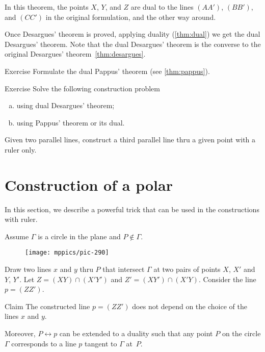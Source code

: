 In this theorem, the points $X$, $Y$, and $Z$ 
are dual to the lines $(AA')$, $(BB')$, and $(CC')$ in the original formulation, and the other way around.

Once Desargues' theorem is proved, applying duality (\ref{thm:dual})
we get the dual Desargues' theorem.
Note that the dual Desargues' theorem is the converse to the original Desargues' theorem~\ref{thm:desargues}.

\begin{thm}{Exercise}\label{ex:dual-pappus}
Formulate the dual Pappus' theorem (see \ref{thm:pappus}).
\end{thm}

\begin{thm}{Exercise}\label{ex:dual-desargues-construction} 
Solve the following construction problem
\begin{enumerate}[(a)]
\item\label{ex:dual-desargues-construction:desargues} using dual Desargues' theorem;
\item\label{ex:dual-desargues-construction:pappus} using Pappus' theorem or its dual.
\end{enumerate}
Given two parallel lines, construct a third parallel line thru a given point with a ruler only.
\end{thm}

\section{Construction of a polar}

In this section, we describe a powerful trick that can be used in the constructions with ruler.

Assume $\Gamma$ is a circle in the plane and $P\notin \Gamma$.
\begin{figure}[!ht]
\centering
\texttt{[image: mppics/pic-290]}
\end{figure}
Draw two lines $x$ and $y$ thru $P$ that intersect $\Gamma$ at two pairs of points $X$, $X'$ and $Y$, $Y'$.
Let $Z=(XY)\cap(X'Y')$ and $Z'=(XY')\cap(X'Y)$.
Consider the line $p=(ZZ')$.

\begin{thm}{Claim}\label{clm:polar}
The constructed line $p=(ZZ')$ does not depend on the choice of the lines $x$ and $y$.

Moreover, $P\leftrightarrow p$ can be extended to a duality such that any point $P$ on the circle $\Gamma$ corresponds to a line $p$ tangent to $\Gamma$ at~$P$. 
\end{thm}


